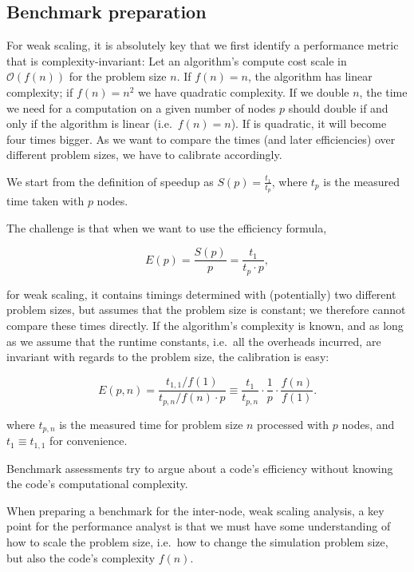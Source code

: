 \subsection{Benchmark preparation}

For weak scaling, it is absolutely key that we first identify a performance metric that is complexity-invariant:
Let an algorithm's compute cost scale in $\mathcal{O}(f(n))$ for the problem size $n$.
If $f(n)=n$, the algorithm has linear complexity; if $f(n)=n^2$ we have quadratic complexity.
If we double $n$, the time we need for a computation on a given number of nodes $p$ should double if and only if the algorithm is linear (i.e.~$f(n)=n$).
If is quadratic, it will become four times bigger.
As we want to compare the times (and later efficiencies) over different problem sizes, we have to calibrate accordingly.

We start from the definition of speedup as $S(p) = \frac{t_1}{t_p}$, where $t_p$ is the measured time taken with $p$ nodes.


The challenge is that when we want to use the efficiency formula,

\[
 E(p) = \frac{ S(p) }{ p }
  = \frac{ t_1 }{ t_p \cdot p },
\]

\noindent
for weak scaling, it contains timings determined with (potentially) two different problem sizes, but assumes that the problem size is constant; we therefore cannot compare these times directly.
If the algorithm's complexity is known, and as long as we assume that the runtime constants, i.e.~all the overheads incurred, are invariant with regards to the problem size, the calibration is easy:

\begin{equation}
 \label{equation:inter-node:efficiency}
 E(p,n)
  = \frac{ t_{1,1}/f(1) }{ t_{p,n}/f(n) \cdot p }
  \equiv \frac{t_{1}}{t_{p,n}}\cdot\frac{1}{p}\cdot\frac{f(n)}{f(1)}.
\end{equation}

\noindent
where $t_{p,n}$ is the measured time for problem size $n$ processed with $p$ nodes, and $t_1\equiv t_{1,1}$ for convenience.


\begin{assessmentcrime}
 Benchmark assessments try to argue about a code's efficiency without knowing the code's computational complexity.
\end{assessmentcrime}

\noindent
When preparing a benchmark for the inter-node, weak scaling analysis, a key point for the performance analyst is that we must have some understanding of how to scale the problem size,
i.e.~how to change the simulation problem size, but also the code's complexity $f(n)$.



